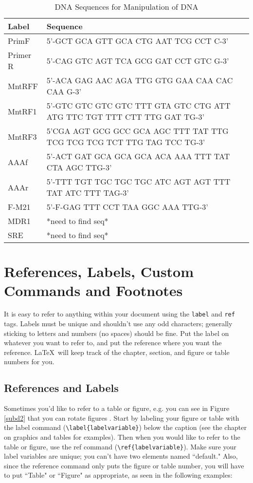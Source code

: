 \documentclass[12pt,twoside]{reedthesis}
\begin{document}
    	\begin{table}[!hp]
    		\caption{DNA Sequences for Manipulation of DNA} 
    		\label{DNAsequences}
    		\begin{tabular}{|l | p{12cm}|}
    			\hline
    			Label & Sequence \\
    			\hline 
    			PrimF & 5'-GCT GCA GTT GCA CTG AAT TCG CCT C-3'  \\ 
    			\hline
    			Primer R  & 5'-CAG GTC AGT TCA GCG GAT CCT GTC G-3' \\  			
    			\hline
    			MntRFF & 5'-ACA GAG AAC AGA TTG GTG GAA CAA CAC CAA G-3'    \\
    			\hline
    			MntRF1  & 5'-GTC GTC GTC GTC TTT GTA GTC CTG ATT ATG TTC TGT TTT CTT TTG GAT TG-3'  \\ 
    			\hline
    			MntRF3 & 5'CGA AGT GCG GCC GCA AGC TTT TAT TTG TCG TCG TCG TCT TTG TAG TCC TG-3'  \\  
    			\hline
    			AAAf & 5'-ACT GAT GCA GCA GCA ACA AAA TTT TAT CTA AGC TTG-3'  \\     
    			\hline
    			AAAr & 5'-TTT TGT TGC TGC TGC ATC AGT AGT TTT TAT ATC TTT TAG-3' \\
    			\hline
    			F-M21 & 5'-F-GAG TTT CCT TAA GGC AAA TTG-3'  \\
    			\hline
    			MDR1 & *need to find seq* \\  
    			\hline
    			SRE & *need to find seq*  \\
    			\hline
    		\end{tabular}
    	\end{table}

\clearpage
\section{References, Labels, Custom Commands and Footnotes}
It is easy to refer to anything within your document using the \texttt{label} and \texttt{ref} tags.  Labels must be unique and shouldn't use any odd characters; generally sticking to letters and numbers (no spaces) should be fine. Put the label on whatever you want to refer to, and put the reference where you want the reference. \LaTeX\ will keep track of the chapter, section, and figure or table numbers for you. 

\subsection{References and Labels}
Sometimes you'd like to refer to a table or figure, e.g. you can see in Figure \ref{subd2} that you can rotate figures . Start by labeling your figure or table with the label command (\verb=\label{labelvariable}=) below the caption (see the chapter on graphics and tables for examples). Then when you would like to refer to the table or figure, use the ref command (\verb=\ref{labelvariable}=). Make sure your label variables are unique; you can't have two elements named ``default." Also, since the reference command only puts the figure or table number, you will have to put  ``Table" or ``Figure" as appropriate, as seen in the following examples:
\end{document}
